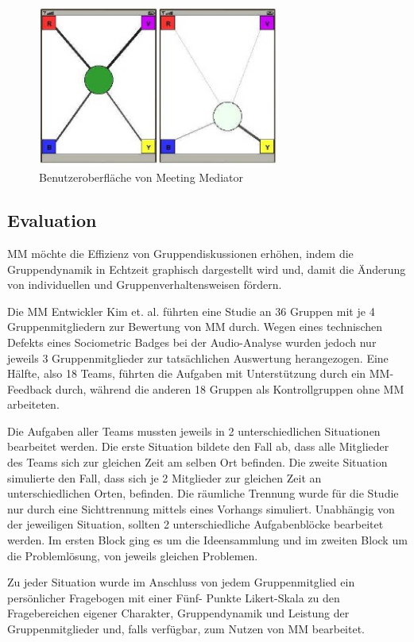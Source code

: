 \begin{figure}[htp] 
\centering 
\includegraphics[width=8cm]{mm.jpg}
\caption{Benutzeroberfläche von Meeting Mediator
\protect\cite{KimChaHolPent2008}}
\label{display}
\end{figure}


\subsection{Evaluation}
MM möchte die Effizienz von Gruppendiskussionen er\-höh\-en, indem die
Gruppendynamik in Echtzeit graphisch dargestellt wird und, damit die Änderung
von individuellen und Gruppenverhaltensweisen fördern.
 
Die MM Entwickler Kim et. al. führten eine Studie \cite{KimChaHolPent2008} an 36
Gruppen mit je 4 Gruppenmitgliedern zur Bewertung von MM durch. Wegen eines
technischen Defekts eines Sociometric Badges bei der Audio-Analyse wurden
jedoch nur jeweils 3 Gruppenmitglieder zur tatsächlichen Auswertung
herangezogen.
Eine Hälfte, also 18 Teams, führten die Aufgaben mit Unterstützung durch ein
MM-Feedback durch, während die anderen 18 Gruppen als Kontrollgruppen ohne MM
arbeiteten.

Die Aufgaben aller Teams mussten jeweils in 2 unterschiedlichen Situationen
bearbeitet werden.
Die erste Situation bildete den Fall ab, dass alle Mitglieder des Teams sich zur
gleichen Zeit am selben Ort befinden. Die zweite Situation simulierte den Fall,
dass sich je 2 Mitglieder zur gleichen Zeit an unterschiedlichen Orten,
befinden.
Die räumliche Trennung wurde für die Studie nur durch eine Sichttrennung mittels
eines Vorhangs simuliert.
Unabhängig von der jeweiligen Situation, sollten 2 unterschiedliche
Aufgabenblöcke bearbeitet werden. Im ersten Block ging es um die Ideensammlung
und im zweiten Block um die Pro\-blem\-lö\-sung, von jeweils gleichen Problemen.

Zu jeder Situation wurde im Anschluss von jedem Gruppenmitglied ein persönlicher
Fragebogen mit einer Fünf- Punkte Likert-Skala \cite{WP_Likert} zu den Fragebereichen eigener
Charakter, Gruppendynamik und Leistung der Gruppenmitglieder und, falls
verfügbar, zum Nutzen von MM bearbeitet.
 
